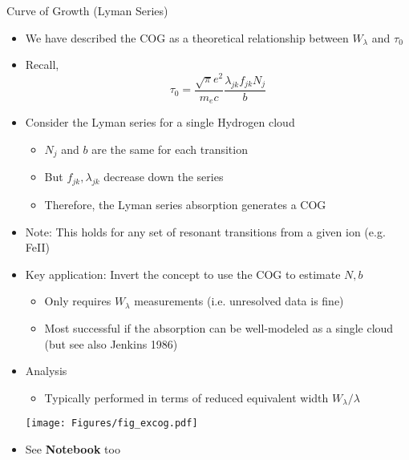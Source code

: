 \documentclass[12pt,letterpaper]{article}
\begin{document}
\begin{Aenumerate}
\begin{itemize}
 \end{itemize}

{\bf \item Curve of Growth (Lyman Series)}
	\begin{itemize}
	\item We have described the COG as a theoretical relationship 
	between $W_\lambda$ and $\tau_0$
	\item Recall, 
	\begin{equation*}
	\tau_0 = \frac{\sqrt{\pi} e^2}{m_e c} \frac{\lambda_{jk} f_{jk} N_j}{b}
	\end{equation*}
	\item Consider the Lyman series for a single Hydrogen cloud
		\begin{itemize}
		\item $N_j$ and $b$ are the same for each transition
		\item But $f_{jk}, \lambda_{jk}$ decrease down the series
		\item Therefore, the Lyman series absorption generates a COG
		\end{itemize}
	\item Note: This holds for any set of resonant 
	transitions from a given ion (e.g. FeII)
	\item Key application:  Invert the concept to use the COG to estimate $N,b$
		\begin{itemize}
		\item Only requires $W_\lambda$ measurements (i.e. unresolved data is fine)
		\item Most successful if the absorption can be well-modeled as a single cloud
		(but see also Jenkins 1986)
		\end{itemize}
	\item Analysis
		\begin{itemize}
		\item Typically performed in terms of reduced equivalent width $W_\lambda/\lambda$
		\end{itemize}
	\texttt{[image: Figures/fig\_excog.pdf]}
	\item See {\bf Notebook} too
	\end{itemize}

\end{Aenumerate}
\end{document}
